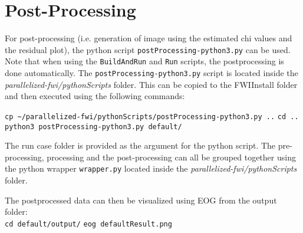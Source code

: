 \documentclass[10pt]{article}
\begin{document}

\section{Post-Processing}
For post-processing (i.e. generation of image using the estimated chi values and the residual plot), the python script \texttt{postProcessing-python3.py} can be used. Note that when using the \texttt{BuildAndRun} and \texttt{Run} scripts, the postprocessing is done automatically. The \texttt{postProcessing-python3.py} script is located inside the \textit{parallelized-fwi/pythonScripts} folder. This can be copied to the FWIInstall folder and then executed using 
the following commands:
\newline

\texttt{cp \textasciitilde/parallelized-fwi/pythonScripts/postProcessing-python3.py ..} \newline
\texttt{cd ..} \newline
\texttt{python3 postProcessing-python3.py default/} 
\newline

The run case folder is provided as the argument for the python script. The pre-processing, processing and the post-processing can all be grouped together using the python wrapper \texttt{wrapper.py} located inside the \textit{parallelized-fwi/pythonScripts} folder.
\newline

\noindent The postprocessed data can then be visualized using EOG from the output folder: \\ \newline
\texttt{cd default/output/} \newline
\texttt{eog defaultResult.png}
\newline
 
\end{document}
